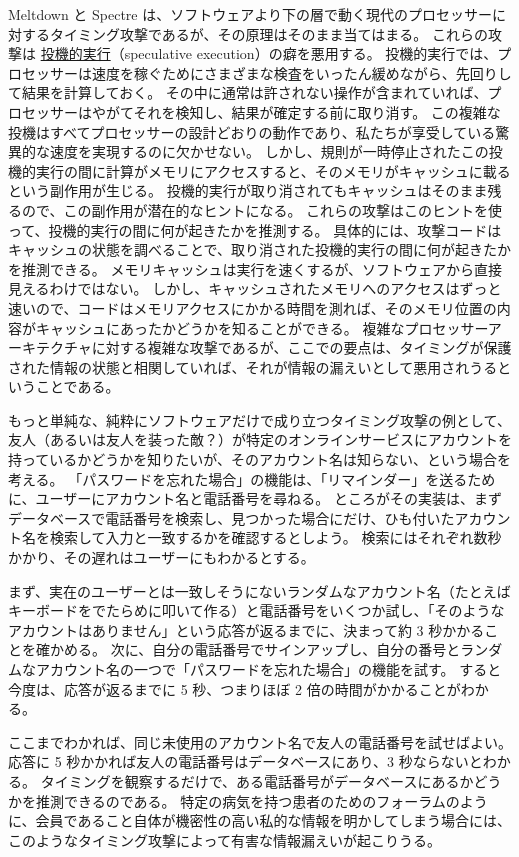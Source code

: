 \documentclass[uplatex]{jsarticle}
\def\label#1{}%
\begin{document}
\begin{exa}\label{exa:ch8-meltdown-spectre}
Meltdown と Spectre は、ソフトウェアより下の層で動く現代のプロセッサーに対するタイミング攻撃であるが、その原理はそのまま当てはまる。
これらの攻撃は \underline{投機的実行}（speculative execution）の癖を悪用する。
投機的実行では、プロセッサーは速度を稼ぐためにさまざまな検査をいったん緩めながら、先回りして結果を計算しておく。
その中に通常は許されない操作が含まれていれば、プロセッサーはやがてそれを検知し、結果が確定する前に取り消す。
この複雑な投機はすべてプロセッサーの設計どおりの動作であり、私たちが享受している驚異的な速度を実現するのに欠かせない。
しかし、規則が一時停止されたこの投機的実行の間に計算がメモリにアクセスすると、そのメモリがキャッシュに載るという副作用が生じる。
投機的実行が取り消されてもキャッシュはそのまま残るので、この副作用が潜在的なヒントになる。
これらの攻撃はこのヒントを使って、投機的実行の間に何が起きたかを推測する。
具体的には、攻撃コードはキャッシュの状態を調べることで、取り消された投機的実行の間に何が起きたかを推測できる。
メモリキャッシュは実行を速くするが、ソフトウェアから直接見えるわけではない。
しかし、キャッシュされたメモリへのアクセスはずっと速いので、コードはメモリアクセスにかかる時間を測れば、そのメモリ位置の内容がキャッシュにあったかどうかを知ることができる。
複雑なプロセッサーアーキテクチャに対する複雑な攻撃であるが、ここでの要点は、タイミングが保護された情報の状態と相関していれば、それが情報の漏えいとして悪用されうるということである。
\end{exa}

\begin{exa}[パスワードを忘れた場合の機能に対するタイミング攻撃]\label{exa:ch8-forgot-password-timing}
もっと単純な、純粋にソフトウェアだけで成り立つタイミング攻撃の例として、友人（あるいは友人を装った敵？）が特定のオンラインサービスにアカウントを持っているかどうかを知りたいが、そのアカウント名は知らない、という場合を考える。
「パスワードを忘れた場合」の機能は、「リマインダー」を送るために、ユーザーにアカウント名と電話番号を尋ねる。
ところがその実装は、まずデータベースで電話番号を検索し、見つかった場合にだけ、ひも付いたアカウント名を検索して入力と一致するかを確認するとしよう。
検索にはそれぞれ数秒かかり、その遅れはユーザーにもわかるとする。

まず、実在のユーザーとは一致しそうにないランダムなアカウント名（たとえばキーボードをでたらめに叩いて作る）と電話番号をいくつか試し、「そのようなアカウントはありません」という応答が返るまでに、決まって約 3 秒かかることを確かめる。
次に、自分の電話番号でサインアップし、自分の番号とランダムなアカウント名の一つで「パスワードを忘れた場合」の機能を試す。
すると今度は、応答が返るまでに 5 秒、つまりほぼ 2 倍の時間がかかることがわかる。

ここまでわかれば、同じ未使用のアカウント名で友人の電話番号を試せばよい。
応答に 5 秒かかれば友人の電話番号はデータベースにあり、3 秒ならないとわかる。
タイミングを観察するだけで、ある電話番号がデータベースにあるかどうかを推測できるのである。
特定の病気を持つ患者のためのフォーラムのように、会員であること自体が機密性の高い私的な情報を明かしてしまう場合には、このようなタイミング攻撃によって有害な情報漏えいが起こりうる。
\end{exa}
\end{document}
